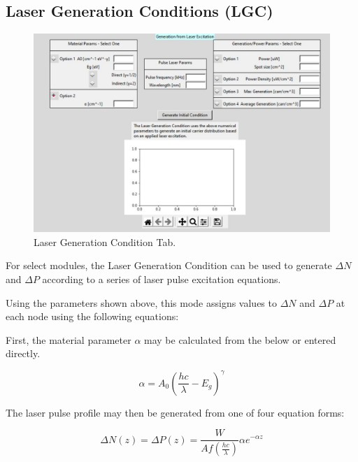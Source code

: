 \documentclass[11pt,letterpaper,titlepage]{article}
\begin{document}
			\subsection {Laser Generation Conditions (LGC)}
			\begin{figure}[H]
				\label{fig:LGC_blank}
				\centering
				\includegraphics[scale=0.6]{"LGC_blank"}
				\caption{Laser Generation Condition Tab.}
			\end{figure}
		
			\par For select modules, the Laser Generation Condition can be used to generate $\Delta N$ and $\Delta P$ according to a series of laser pulse excitation equations.
			
			\par Using the parameters shown above, this mode assigns values to $\Delta N$ and $\Delta P$ at each node using the following equations:
	
			\par First, the material parameter $\alpha$ may be calculated from the below or entered directly.
			
			\begin{equation}
				\label{eq:LGC_absorption}
				\alpha = A_{0}\left(\frac{hc}{\lambda} - E_{g}\right)^{\gamma}
			\end{equation}
		
			\par The laser pulse profile may then be generated from one of four equation forms:
			
			\begin{equation}
				\label{eq:LGC_power}
				\Delta N(z) = \Delta P(z) = \frac{W}{Af\left(\frac{hc}{\lambda}\right)} \alpha e^{-\alpha z}
			\end{equation}
		
\end{document}
